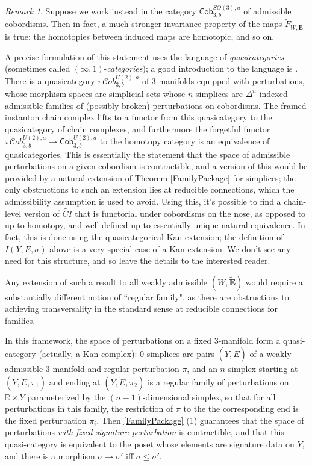 \documentclass{memo-l}
\theoremstyle{definition}
\theoremstyle{remark}
\newtheorem{remark}[theorem]{Remark}
\numberwithin{section}{chapter}
\numberwithin{equation}{chapter}
\begin{document}
\begin{remark}\label{infty-stuff}Suppose we work instead in the category $\mathsf{Cob}_{3,b}^{SO(3),a}$ of admissible cobordisms. Then in fact, a much stronger invariance property of the maps $\widetilde F_{W,\mathbf{E}}$ is true: the homotopies between induced maps are homotopic, and so on. 

A precise formulation of this statement uses the language of \emph{quasicategories} (sometimes called $(\infty,1)$-\emph{categories}); a good introduction to the language is \cite{HLS}. There is a quasicategory $\pi\mathcal{C}ob_{3,b}^{U(2),a}$ of 3-manifolds equipped with perturbations, whose morphism spaces are simplicial sets whose $n$-simplices are $\Delta^n$-indexed admissible families of (possibly broken) perturbations on cobordisms. The framed instanton chain complex lifts to a functor from this quasicategory to the quasicategory of chain complexes, and furthermore the forgetful functor $\pi\mathcal{C}ob_{3,b}^{U(2),a} \to \mathsf{Cob}_{3,b}^{U(2),a}$ to the homotopy category is an equivalence of quasicategories. This is essentially the statement that the space of admissible perturbations on a given cobordism is contractible, and a version of this would be provided by a natural extension of Theorem \ref{FamilyPackage} for simplices; the only obstructions to such an extension lies at reducible connections, which the admissibility assumption is used to avoid. Using this, it's possible to find a chain-level version of $\widetilde{CI}$ that is functorial under cobordisms on the nose, as opposed to up to homotopy, and well-defined up to essentially unique natural equivalence. In fact, this is done using the quasicategorical Kan extension; the definition of $I(Y,E,\sigma)$ above is a very special case of a Kan extension. We don't see any need for this structure, and so leave the details to the interested reader.

Any extension of such a result to all weakly admissible $(W,\widetilde{\mathbf{E}})$ would require a substantially different notion of ``regular family", as there are obstructions to achieving transversality in the standard sense at reducible connections for families. 

In this framework, the space of perturbations on a fixed 3-manifold form a quasi-category (actually, a Kan complex): $0$-simplices are pairs $(Y,\tilde E)$ of a weakly admissible 3-manifold and regular perturbation $\pi$, and an $n$-simplex starting at $(Y,\tilde E,\pi_1)$ and ending at $(Y,\tilde E,\pi_2)$ is a regular family of perturbations on $\mathbb R \times Y$ parameterized by the $(n-1)$-dimensional simplex, so that for all perturbations in this family, the restriction of $\pi$ to the the corresponding end is the fixed perturbation $\pi_i$. Then \ref{FamilyPackage} (1) guarantees that the space of perturbations \emph{with fixed signature perturbation} is contractible, and that this quasi-category is equivalent to the poset whose elements are signature data on $Y$, and there is a morphism $\sigma \to \sigma'$ iff $\sigma \leq \sigma'$.
\end{remark}
\end{document}
